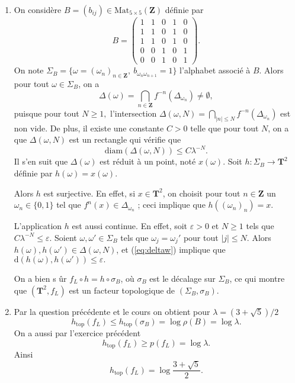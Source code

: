 \documentclass[a4paper,12pt,openany]{article}
\theoremstyle{plain}
\theoremstyle{definition}
\newcommand{\dd}{\mathrm{d}}
\newcommand{\T}{\mathbf{T}}
\newcommand{\Z}{\mathbf{Z}}
\newcommand{\htop}{h_\mathrm{top}}
\begin{document}
\vspace{0.6cm}


 \vspace{1.5mm} 

\begin{enumerate}
\item On consid\`ere $B = (b_{ij}) \in \mathrm{Mat}_{5\times 5}(\Z)$ d\'efinie par
$$
B = \begin{pmatrix}
1 & 1 & 0 & 1 & 0 \\
1 & 1 & 0 & 1 & 0 \\
1 & 1 & 0 & 1 & 0 \\
0 & 0 & 1 & 0 & 1 \\
0 & 0 & 1 & 0 & 1
\end{pmatrix}.
$$
On note 
$\Sigma_B = \{\omega = (\omega_n)_{n \in \Z},~ b_{\omega_n \omega_{n+1}} = 1\}$
l'alphabet associ\'e \`a $B$. Alors pour tout $\omega \in \Sigma_B$, on a 
$$
\Delta(\omega) = \bigcap_{n \in \Z} f^{-n}( \Delta_{\omega_n}) \neq \emptyset,
$$
puisque pour tout $N \geq 1,$ l'intersection $ \Delta(\omega, N) = \bigcap_{|n|\leq N} f^{-n}(\Delta_{\omega_n})$ est non vide. De plus, il existe une constante $C>0$ telle que pour tout $N$, on a que $\Delta(\omega, N)$ est un rectangle qui v\'erifie que
\begin{equation}\label{eq:deltaw}
\mathrm{diam}(\Delta(\omega, N)) \leq C \lambda^{-N}.
\end{equation}
Il s'en suit que $\Delta(\omega)$ est r\'eduit \`a un point, not\'e $x(\omega)$. Soit $h : \Sigma_B \to \T^2$ d\'efinie par $h(\omega) = x(\omega).$ 

Alors $h$ est surjective. En effet, si $x \in \T^2$, on choisit pour tout $n \in \Z$ un $\omega_n \in \{0,1\}$ tel que $f^n(x) \in \Delta_{\omega_n}$ ; ceci implique que $h((\omega_n)_n) = x$.

L'application $h$ est aussi continue. En effet, soit $\varepsilon > 0$ et $N \geq 1$ tels que $C\lambda^{-N} \leq \varepsilon.$ Soient $\omega, \omega' \in \Sigma_B$ tels que $\omega_j = \omega_j'$ pour tout $|j| \leq N$. Alors $h(\omega), h(\omega') \in \Delta(\omega, N)$, et (\ref{eq:deltaw}) implique que $\dd(h(\omega), h(\omega')) \leq \varepsilon.$

On a bien s \^ur $f_L\circ h = h \circ \sigma_B$, o\`u $\sigma_B$ est le d\'ecalage sur $\Sigma_B$, ce qui montre que $(\T^2, f_L)$ est un facteur topologique de $(\Sigma_B, \sigma_B)$.

\item Par la question pr\'ec\'edente et le cours on obtient pour $\lambda = (3 + \sqrt{5})/2$
$$
\htop(f_L) \leq \htop(\sigma_B) = \log \rho(B) = \log \lambda.
$$
On a aussi par l'exercice pr\'ec\'edent 
$$
\htop(f_L) \geq p(f_L) = \log \lambda.
$$
Ainsi 
$$\htop(f_L) = \log \frac{3 + \sqrt{5}}{2}.$$
\end{enumerate}
\end{document}
